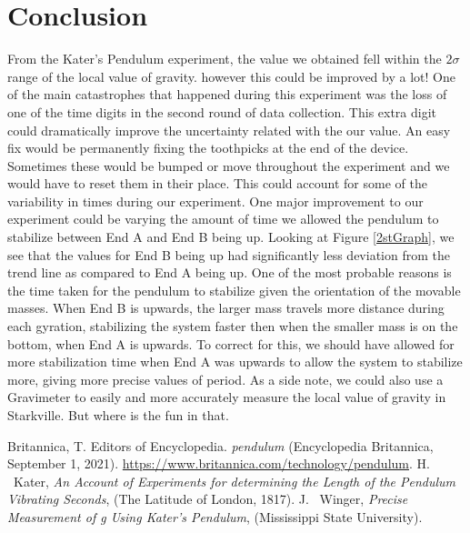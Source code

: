 \documentclass[aps,prl,10pt,twocolumn,floatfix]{revtex4-2}
\begin{document}
\section{Conclusion}
From the Kater's Pendulum experiment, the value we obtained fell within the $2\sigma$ range of the local value of gravity.
however this could be improved by a lot!
One of the main catastrophes that happened during this experiment was the loss of one of the time digits in the second round of data collection. 
This extra digit could dramatically improve the uncertainty related with the our value.
An easy fix would be permanently fixing the toothpicks at the end of the device.
Sometimes these would be bumped or move throughout the experiment and we would have to reset them in their place.
This could account for some of the variability in times during our experiment. 
One major improvement to our experiment could be varying the amount of time we allowed the pendulum to stabilize between End A and End B being up.
Looking at Figure \ref{2stGraph}, we see that the values for End B being up had significantly less deviation from the trend line as compared to End A being up. 
One of the most probable reasons is the time taken for the pendulum to stabilize given the orientation of the movable masses. 
When End B is upwards, the larger mass travels more distance during each gyration, stabilizing the system faster then when the smaller mass is on the bottom, when End A is upwards. 
To correct for this, we should have allowed for more stabilization time when End A was upwards to allow the system to stabilize more, giving more precise values of period. 
As a side note, we could also use a Gravimeter to easily and more accurately measure the local value of gravity in Starkville.
But where is the fun in that.

\begin{thebibliography}{9}
 Britannica, T. Editors of Encyclopedia. \textit{pendulum} (Encyclopedia Britannica, September 1, 2021). \url{https://www.britannica.com/technology/pendulum}.
 H. ~Kater, \textit{An Account of Experiments for determining the Length of the Pendulum Vibrating Seconds}, (The Latitude of London, 1817).
 J. ~Winger, \textit{Precise Measurement of g Using Kater’s Pendulum}, (Mississippi State University).
\end{thebibliography}
\end{document}
